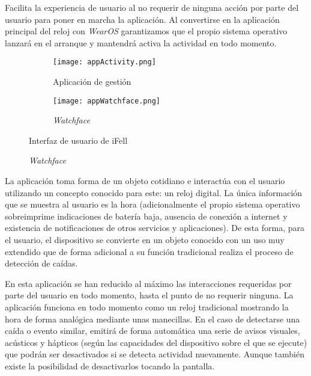 Facilita la experiencia de usuario al no requerir de ninguna acción por parte del usuario para poner en marcha la aplicación. Al convertirse en la aplicación principal del reloj con  \textit{WearOS} garantizamos que el propio sistema operativo lanzará en el arranque y mantendrá activa la actividad en todo momento.

\begin{figure}[!ht]
  \centering
  \begin{subfigure}[b]{0.4\textwidth}
      \centering
      \texttt{[image: appActivity.png]}
      \caption{Aplicación de gestión}
      \label{fig:uiActivity}
  \end{subfigure}
  \hfill
  \begin{subfigure}[b]{0.4\textwidth}
      \centering
      \texttt{[image: appWatchface.png]}
      \caption{\textit{Watchface}}
      \label{fig:uiWatchface}
  \end{subfigure}
  \caption{\label{fig:ifell:UI} Interfaz de usuario de iFell}
\iffalse
\subfloat{\label{fig:uiActivity} Aplicación de gestión}{\texttt{[image: appActivity.png]}}
     \caption{\label{fig:uiApps} Interfaces de usuario}
     \hfill
\subfloat{\label{fig:uiWatchface} Watchface}{\texttt{[image: appWatchface.png]}}
\fi
\end{figure}


La aplicación toma forma de un objeto cotidiano e interactúa con el usuario utilizando un concepto conocido para este: un reloj digital. La única información que se muestra al usuario es la hora (adicionalmente el propio sistema operativo sobreimprime indicaciones de batería baja, ausencia de conexión a internet y existencia de notificaciones de otros servicios y aplicaciones). De esta forma, para el usuario, el dispositivo se convierte en un objeto conocido con un uso muy extendido que de forma adicional a su función tradicional realiza el proceso de detección de caídas.

En esta aplicación se han reducido al máximo las interacciones requeridas por parte del usuario en todo momento, hasta el punto de no requerir ninguna. La aplicación funciona en todo momento como un reloj tradicional mostrando la hora de forma analógica mediante unas manecillas. En el caso de detectarse una caída o evento similar, emitirá de forma automática una serie de avisos visuales, acústicos y hápticos (según las capacidades del dispositivo sobre el que se ejecute) que podrán ser desactivados si se detecta actividad nuevamente. Aunque también existe la posibilidad de desactivarlos tocando la pantalla.


